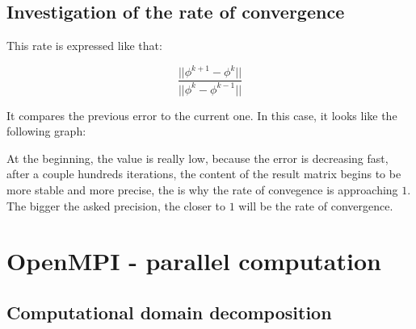 \documentclass[a4paper,11pt]{article}
\begin{document}
\subsection{Investigation of the rate of convergence}

This rate is expressed like that:

\[
  \frac{||\phi^{k+1}-\phi^{k}||}{||\phi^{k}-\phi^{k-1}||}
\]

It compares the previous error to the current one. In this case, it looks like the following
graph:



At the beginning, the value is really low, because the error is decreasing fast, after a couple
hundreds iterations, the content of the result matrix begins to be more stable and more precise,
the is why the rate of convegence is approaching $1$. The bigger the asked precision, the closer
to $1$ will be the rate of convergence.

\clearpage  

\section{OpenMPI - parallel computation}

\subsection{Computational domain decomposition}
\end{document}
